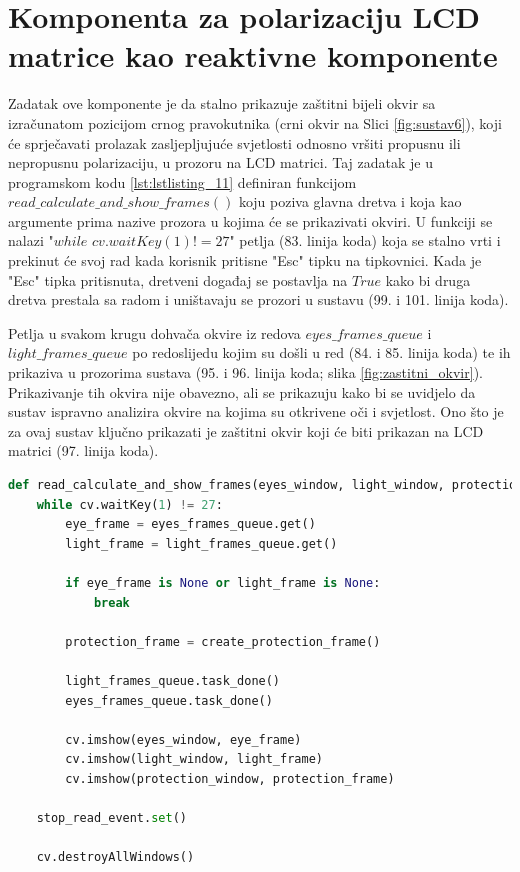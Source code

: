 \documentclass{foi}
\begin{document}
\pagebreak
\section{Komponenta za polarizaciju LCD matrice kao reaktivne komponente}

Zadatak ove komponente je da stalno prikazuje zaštitni bijeli okvir sa izračunatom pozicijom crnog pravokutnika (crni okvir na Slici \ref{fig:sustav6}), koji će sprječavati prolazak zasljepljujuće svjetlosti odnosno vršiti propusnu ili nepropusnu polarizaciju, u prozoru na LCD matrici. Taj zadatak je u programskom kodu \ref{lst:lstlisting_11} definiran funkcijom $read\_calculate\_and\_show\_frames()$ koju poziva glavna dretva i koja kao argumente prima nazive prozora u kojima će se prikazivati okviri. U funkciji se nalazi "$while$ $cv.waitKey(1) != 27$" petlja (83. linija koda) koja se stalno vrti i prekinut će svoj rad kada korisnik pritisne "Esc" tipku na tipkovnici. Kada je "Esc" tipka pritisnuta, dretveni događaj se postavlja na $True$ kako bi druga dretva prestala sa radom i uništavaju se prozori u sustavu (99. i 101. linija koda).

Petlja u svakom krugu dohvača okvire iz redova $eyes\_frames\_queue$ i $light\_frames\_queue$ po redoslijedu kojim su došli u red (84. i 85. linija koda) te ih prikaziva u prozorima sustava (95. i 96. linija koda; slika \ref{fig:zastitni_okvir}). Prikazivanje tih okvira nije obavezno, ali se prikazuju kako bi se uvidjelo da sustav ispravno analizira okvire na kojima su otkrivene oči i svjetlost. Ono što je za ovaj sustav ključno prikazati je zaštitni okvir koji će biti prikazan na LCD matrici (97. linija koda).

\begin{lstlisting}[language=Python, label={lst:lstlisting_11}, firstnumber=82, style=colored, caption={Definicija funkcije $read\_calculate\_and\_show\_frames()$}]
def read_calculate_and_show_frames(eyes_window, light_window, protection_window):
    while cv.waitKey(1) != 27:
        eye_frame = eyes_frames_queue.get()
        light_frame = light_frames_queue.get()

        if eye_frame is None or light_frame is None:
            break

        protection_frame = create_protection_frame()

        light_frames_queue.task_done()
        eyes_frames_queue.task_done()

        cv.imshow(eyes_window, eye_frame)
        cv.imshow(light_window, light_frame)
        cv.imshow(protection_window, protection_frame)

    stop_read_event.set()

    cv.destroyAllWindows()
\end{lstlisting}
\end{document}
